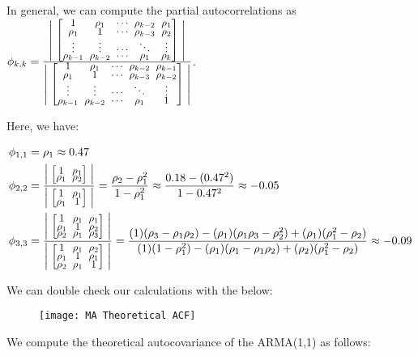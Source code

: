 \documentclass[12pt, letterpaper]{article}
\newcommand{\mymatrix}[1]{
	\renewcommand{\arraystretch}{0.5} %
	\setlength\arraycolsep{3pt}       %
	\scalebox{0.90}{                  %
		$\begin{bmatrix}
			#1
		\end{bmatrix}$
	}                   
	\renewcommand{\arraystretch}{1.0} %
	\setlength\arraycolsep{6pt}       %
}
\theoremstyle{definition}
\numberwithin{equation}{section}
\newcommand{\+}[1]{+_{\scalebox{.375}{#1}}}
\newcommand{\1}{\mathbbm{1}}
\begin{document}
In general, we can compute the partial autocorrelations as $\phi_{k,k}=\frac{\left|\mymatrix{
		1 & \rho_1 & \cdots & \rho_{k-2} & \rho_1 \\
		\rho_1 & 1 & \cdots & \rho_{k-3} & \rho_2\\
		\vdots & \vdots & \cdots & \ddots & \vdots\\
		\rho_{k-1} & \rho_{k-2} & \cdots & \rho_1 & \rho_k
	}\right|}{\left|\mymatrix{
		1 & \rho_1 & \cdots & \rho_{k-2} & \rho_{k-1} \\
		\rho_1 & 1 & \cdots & \rho_{k-3} & \rho_{k-2}\\
		\vdots & \vdots & \cdots & \ddots & \vdots\\
		\rho_{k-1} & \rho_{k-2} & \cdots & \rho_1 & 1
	}\right|}$.

Here, we have:

\vspace{-0.5cm}
\begin{align*}
	\phi_{1,1}&=\rho_1\approx 0.47\\
	\phi_{2,2}&=\frac{\left|\mymatrix{1 & \rho_1\\
			\rho_1 &\rho_2}\right|}{\left|\mymatrix{1 & \rho_1\\
			\rho_1 &1}\right|}=\frac{\rho_2-\rho_1^2}{1-\rho_1^2}\approx \frac{0.18-(0.47^2)}{1-0.47^2}\approx -0.05\\
	\phi_{3,3}&=\frac{\left|\mymatrix{
				 1 & \rho_1 & \rho_1\\
			\rho_1 &      1 & \rho_2\\
			\rho_2 & \rho_1 & \rho_3} \right|}{\left|\mymatrix{
				 1 & \rho_1 & \rho_2\\
			\rho_1 &      1 & \rho_1\\
			\rho_2 & \rho_1 & 1
	}\right|}=\frac{(1)(\rho_3-\rho_1\rho_2)-(\rho_1)(\rho_1\rho_3-\rho_2^2)+(\rho_1)(\rho_1^2-\rho_2)}{(1)(1-\rho_1^2)-(\rho_1)(\rho_1-\rho_1\rho_2)+(\rho_2)(\rho_1^2-\rho_2)}\approx  -0.09
\end{align*}


We can double check our calculations with the below:

\begin{figure}[H]
	\centering
	\texttt{[image: MA Theoretical ACF]}
\end{figure}

We compute the theoretical autocovariance of the ARMA(1,1) as follows:
\end{document}
